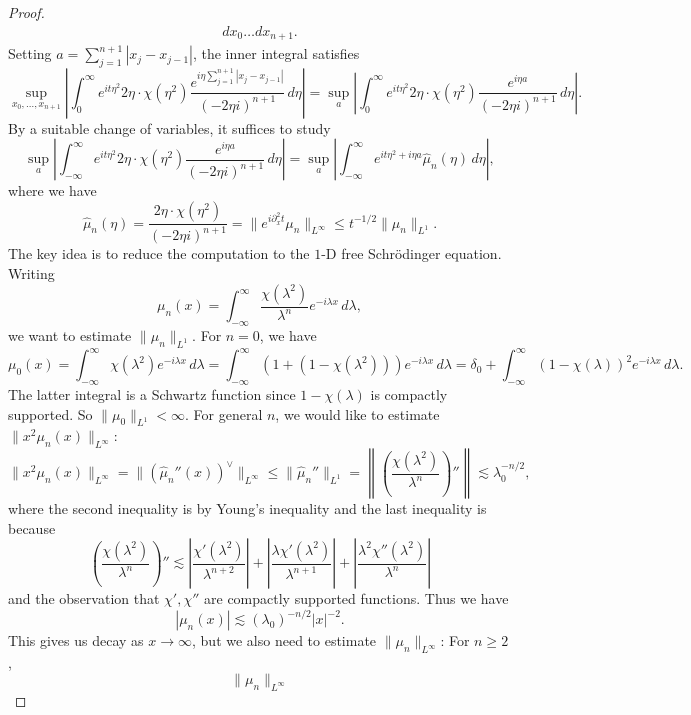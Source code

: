\begin{proof}
\begin{align*}
    dx_0 \dots dx_{n + 1}.
  \end{align*}
  Setting $a = \sum_{j = 1}^{n + 1} |x_j - x_{j - 1}|$,
  the inner integral satisfies
  \[
    \sup_{x_0, \dots, x_{n + 1}} \left| \int_0^\infty e^{it\eta^2} 2\eta \cdot \chi(\eta^2) \frac{e^{i \eta \sum_{j = 1}^{n + 1} |x_j - x_{j - 1}|}}{(-2\eta i)^{n + 1}}\, d\eta \right|
    = \sup_a \left| \int_0^\infty e^{it\eta^2} 2\eta \cdot \chi(\eta^2) \frac{e^{i \eta a}}{(-2\eta i)^{n + 1}}\, d\eta \right|.
  \]
  By a suitable change of variables, it suffices to study
  \[
    \sup_a \left| \int_{-\infty}^\infty e^{it\eta^2} 2\eta \cdot \chi(\eta^2) \frac{e^{i \eta a}}{(-2\eta i)^{n + 1}}\, d\eta \right|
    = \sup_a \left| \int_{-\infty}^\infty e^{it\eta^2 + i\eta a} \widehat{\mu}_n(\eta)\, d\eta \right|,
  \]
  where we have
  \[
    \widehat{\mu}_n(\eta) = \frac{2\eta \cdot \chi(\eta^2)}{(-2\eta i)^{n + 1}}
    = \|e^{i\partial_x^2 t} \mu_n \|_{L^\infty}
    \le t^{-1 / 2}\|\mu_n \|_{L^1}.
  \]
  The key idea is to reduce
  the computation to the $1$-D free Schr\"odinger
  equation. Writing
  \[
    \mu_n(x) = \int_{-\infty}^\infty \frac{\chi(\lambda^2)}{\lambda^n} e^{-i\lambda x}\, d\lambda,
  \]
  we want to estimate $\|\mu_n\|_{L^1}$. For $n = 0$,
  we have
  \[
    \mu_0(x) = \int_{-\infty}^\infty \chi(\lambda^2) e^{-i\lambda x}\, d\lambda
    = \int_{-\infty}^\infty (1 + (1 - \chi(\lambda^2))) e^{-i\lambda x}\, d\lambda
    = \delta_0 + \int_{-\infty}^\infty (1 - \chi(\lambda))^2 e^{-i\lambda x}\, d\lambda.
  \]
  The latter integral is a Schwartz
  function since $1 - \chi(\lambda)$ is compactly
  supported. So $\|\mu_0\|_{L^1} < \infty$.
  For general $n$, we would like to estimate
  $\|x^2 \mu_n(x)\|_{L^\infty}$:
  \[
    \|x^2 \mu_n(x)\|_{L^\infty}
    = \|(\widehat{\mu}_n''(x))^\vee\|_{L^\infty}
    \le \|\widehat{\mu}_n''\|_{L^1}
    = \left\| \left(\frac{\chi(\lambda^2)}{\lambda^n}\right)'' \right\|
    \lesssim \lambda_0^{-n / 2},
  \]
  where the second inequality is by Young's inequality
  and the last inequality is because
  \[
    \left(\frac{\chi(\lambda^2)}{\lambda^n}\right)''
    \lesssim \left|\frac{\chi'(\lambda^2)}{\lambda^{n + 2}}\right|
    + \left|\frac{\lambda \chi'(\lambda^2)}{\lambda^{n + 1}}\right|
    + \left|\frac{\lambda^2 \chi''(\lambda^2)}{\lambda^{n}}\right|
  \]
  and the observation that $\chi', \chi''$ are
  compactly supported functions. Thus we have
  \[
    |\mu_n(x)| \lesssim (\lambda_0)^{-n / 2} |x|^{-2}.
  \]
  This gives us decay as $x \to \infty$, but we also
  need to estimate $\|\mu_n\|_{L^\infty}$: For $n \ge 2$,
  \[
    \| \mu_n \|_{L^\infty}
\]
\end{proof}
